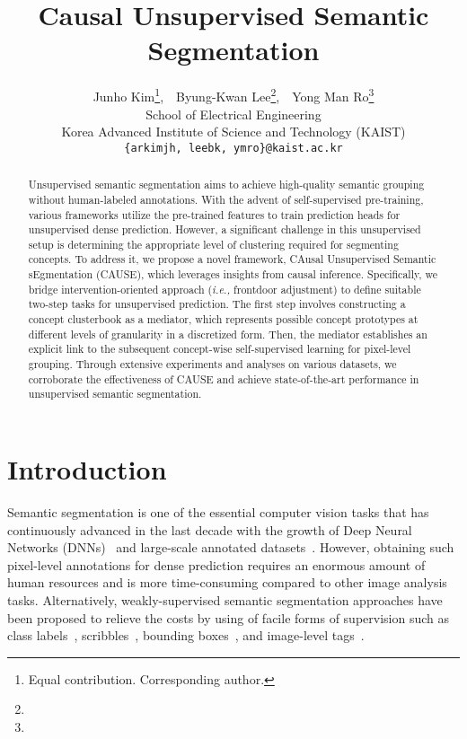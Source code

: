 \documentclass{article} \usepackage{iclr2024_conference,times}
\title{Causal Unsupervised Semantic Segmentation}
\author{Junho Kim\thanks{Equal contribution.  Corresponding author.},~~Byung-Kwan Lee\footnote[1]{},~~Yong Man Ro\footnote[2]{}\\
  School of Electrical Engineering \\
  Korea Advanced Institute of Science and Technology (KAIST) \\
  \texttt{\{arkimjh,~leebk,~ymro\}@kaist.ac.kr} \\
}
\begin{document}

\maketitle

\begin{abstract}
Unsupervised semantic segmentation aims to achieve high-quality semantic grouping without human-labeled annotations. With the advent of self-supervised pre-training, various frameworks utilize the pre-trained features to train prediction heads for unsupervised dense prediction. However, a significant challenge in this unsupervised setup is determining the appropriate level of clustering required for segmenting concepts. To address it, we propose a novel framework, CAusal Unsupervised Semantic sEgmentation (CAUSE), which leverages insights from causal inference. Specifically, we bridge intervention-oriented approach (\textit{i.e.,} frontdoor adjustment) to define suitable two-step tasks for unsupervised prediction. The first step involves constructing a concept clusterbook as a mediator, which represents possible concept prototypes at different levels of granularity in a discretized form. Then, the mediator establishes an explicit link to the subsequent concept-wise self-supervised learning for pixel-level grouping. Through extensive experiments and analyses on various datasets, we corroborate the effectiveness of CAUSE and achieve state-of-the-art performance in unsupervised semantic segmentation.
\end{abstract}

\section{Introduction}

\label{sec:1} 
Semantic segmentation is one of the essential computer vision tasks that has continuously advanced in the last decade with the growth of Deep Neural Networks (DNNs)~\citep{resnet, dosovitskiy2020image, carion2020end} and large-scale annotated datasets~\citep{everingham2010pascal, cordts2016cityscapes, caesar2018coco}. However, obtaining such pixel-level annotations for dense prediction requires an enormous amount of human resources and is more time-consuming compared to other image analysis tasks. Alternatively, weakly-supervised semantic segmentation approaches have been proposed to relieve the costs by using of facile forms of supervision such as class labels~\citep{wang2020self, zhang2020causal}, scribbles~\citep{lin2016scribblesup}, bounding boxes~\citep{dai2015boxsup, khoreva2017simple}, and image-level tags~\citep{xu2015learning, tang2018regularized}.
\end{document}
